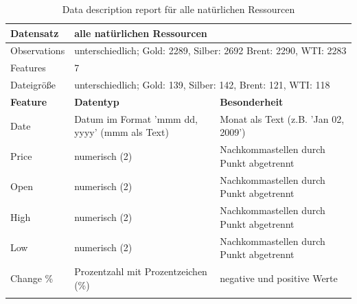 \begin{centering} \footnotesize \begin{longtable}[!h]{|p{4cm}|p{}|p{}|}
\hline
Datensatz & \multicolumn{2}{l|}{alle natürlichen Ressourcen} \\ \hline
Observations & \multicolumn{2}{p{9cm}|}{unterschiedlich; Gold: 2289, Silber: 2692 Brent: 2290, WTI: 2283}\\ \hline
Features & \multicolumn{2}{l|}{7} \\ \hline
Dateigröße & \multicolumn{2}{l|}{unterschiedlich; Gold: 139, Silber: 142, Brent: 121, WTI: 118} \\ \hline
\hhline{===}
\textbf{Feature} & \textbf{Datentyp} & \textbf{Besonderheit}\\ 
\hhline{===}
Date & Datum im Format 'mmm dd, yyyy' (mmm als Text) & Monat als Text (z.B. 'Jan 02, 2009') \\ \hline
Price & numerisch (2) & Nachkommastellen durch Punkt abgetrennt \\ \hline 
Open &  numerisch (2) & Nachkommastellen durch Punkt abgetrennt \\ \hline 
High &  numerisch (2) & Nachkommastellen durch Punkt abgetrennt \\ \hline 
Low &  numerisch (2) & Nachkommastellen durch Punkt abgetrennt \\ \hline 
Change \% & Prozentzahl mit Prozentzeichen (\%) & negative und positive Werte \\ \hline
\caption{Data description report für alle natürlichen Ressourcen}
\end{longtable} \end{centering}
